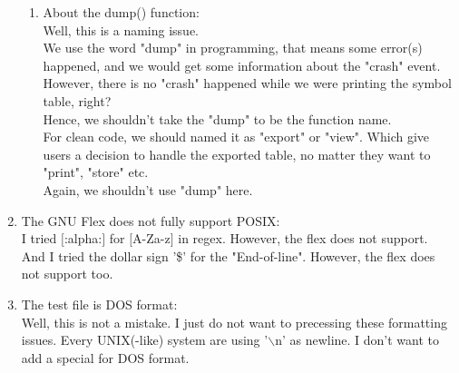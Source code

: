 \documentclass[12pt,a4paper]{article}
\begin{document}
\begin{CJK}{UTF8}{bsmi}
\begin{enumerate}
\begin{enumerate}
                  \item About the dump() function:\\
                        Well, this is a naming issue.\\
                        We use the word "dump" in programming, that means some error(s)
                        happened, and we would get some information about the "crash" event.
                        However, there is no "crash" happened while we were printing the
                        symbol table, right?\\
                        Hence, we shouldn't take the "dump" to be the function name.\\
                        For clean code, we should named it as "export" or "view". Which
                        give users a decision to handle the exported table, no matter they
                        want to "print", "store" etc.\\
                        Again, we shouldn't use "dump" here.
              \end{enumerate}

        \item The GNU Flex does not fully support POSIX:\\
              I tried $[$:alpha:$]$ for $[$A-Za-z$]$ in regex. However, the flex does
              not support.\\
              And I tried the dollar sign '\$' for the "End-of-line". However, the flex
              does not support too.

        \item The test file is DOS format:\\
              Well, this is not a mistake. I just do not want to precessing these formatting issues.
              Every UNIX(-like) system are using '$\backslash$n' as newline. I don't want
              to add a special for DOS format.


\end{enumerate}
\end{CJK}
\end{document}
